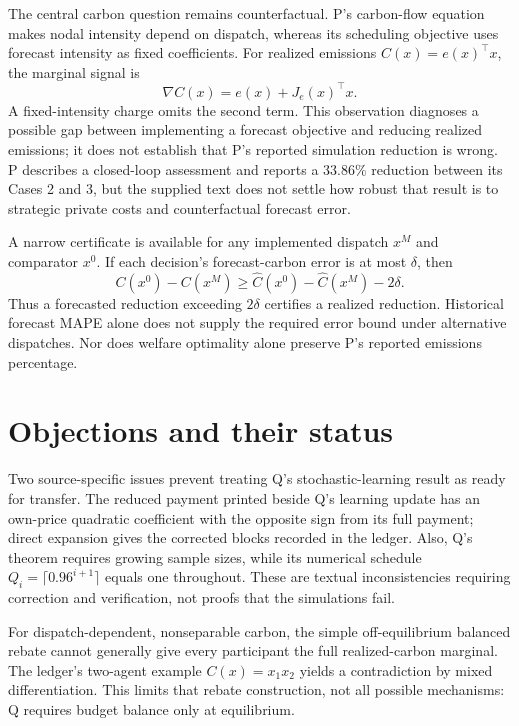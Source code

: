 \documentclass{article}
\begin{document}
The central carbon question remains counterfactual. P's carbon-flow equation makes nodal intensity depend on dispatch, whereas its scheduling objective uses forecast intensity as fixed coefficients. For realized emissions \(C(x)=e(x)^\top x\), the marginal signal is
\[
\nabla C(x)=e(x)+J_e(x)^\top x.
\]
A fixed-intensity charge omits the second term. This observation diagnoses a possible gap between implementing a forecast objective and reducing realized emissions; it does not establish that P's reported simulation reduction is wrong. P describes a closed-loop assessment and reports a \(33.86\%\) reduction between its Cases 2 and 3, but the supplied text does not settle how robust that result is to strategic private costs and counterfactual forecast error. 

A narrow certificate is available for any implemented dispatch \(x^M\) and comparator \(x^0\). If each decision's forecast-carbon error is at most \(\delta\), then
\[
C(x^0)-C(x^M)
\geq
\widehat C(x^0)-\widehat C(x^M)-2\delta.
\]
Thus a forecasted reduction exceeding \(2\delta\) certifies a realized reduction. Historical forecast MAPE alone does not supply the required error bound under alternative dispatches. Nor does welfare optimality alone preserve P's reported emissions percentage. 

\section*{Objections and their status}

Two source-specific issues prevent treating Q's stochastic-learning result as ready for transfer. The reduced payment printed beside Q's learning update has an own-price quadratic coefficient with the opposite sign from its full payment; direct expansion gives the corrected blocks recorded in the ledger. Also, Q's theorem requires growing sample sizes, while its numerical schedule \(Q_i=\lceil 0.96^{i+1}\rceil\) equals one throughout. These are textual inconsistencies requiring correction and verification, not proofs that the simulations fail. 

For dispatch-dependent, nonseparable carbon, the simple off-equilibrium balanced rebate cannot generally give every participant the full realized-carbon marginal. The ledger's two-agent example \(C(x)=x_1x_2\) yields a contradiction by mixed differentiation. This limits that rebate construction, not all possible mechanisms: Q requires budget balance only at equilibrium. 
\end{document}
